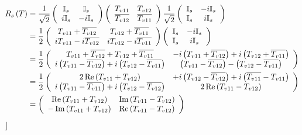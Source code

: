 \documentclass[aps,preprint]{revtex4}%
\begin{document}
\begin{align}
R_{s}\left(  T\right)   &  =\frac{1}{\sqrt{2}}\left(
\begin{array}
[c]{cc}%
\mathbb{I}_{s} & \mathbb{I}_{s}\\
i\mathbb{I}_{s} & -i\mathbb{I}_{s}%
\end{array}
\right)  \left(
\begin{array}
[c]{cc}%
T_{v11} & T_{v12}\\
\overline{T_{v12}} & \overline{T_{v11}}%
\end{array}
\right)  \frac{1}{\sqrt{2}}\left(
\begin{array}
[c]{cc}%
\mathbb{I}_{s} & -i\mathbb{I}_{s}\\
\mathbb{I}_{s} & i\mathbb{I}_{s}%
\end{array}
\right) \\
&  =\frac{1}{2}\left(
\begin{array}
[c]{cc}%
T_{v11}+\overline{T_{v12}} & T_{v12}+\overline{T_{v11}}\\
iT_{v11}-i\overline{T_{v12}} & iT_{v12}-i\overline{T_{v11}}%
\end{array}
\right)  \left(
\begin{array}
[c]{cc}%
\mathbb{I}_{s} & -i\mathbb{I}_{s}\\
\mathbb{I}_{s} & i\mathbb{I}_{s}%
\end{array}
\right) \\
&  =\frac{1}{2}\left(
\begin{array}
[c]{cc}%
T_{v11}+\overline{T_{v12}}+T_{v12}+\overline{T_{v11}} & -i\left(
T_{v11}+\overline{T_{v12}}\right)  +i\left(  T_{v12}+\overline{T_{v11}}\right)
\\
i\left(  T_{v11}-\overline{T_{v12}}\right)  +i\left(  T_{v12}-\overline
{T_{v11}}\right)  & \left(  T_{v11}-\overline{T_{v12}}\right)  -\left(
T_{v12}-\overline{T_{v11}}\right)
\end{array}
\right) \\
&  =\frac{1}{2}\left(
\begin{array}
[c]{cc}%
2\operatorname{Re}\left(  T_{v11}+T_{v12}\right)  & +i\left(  T_{v12}%
-\overline{T_{v12}}\right)  +i\left(  \overline{T_{v11}}-T_{v11}\right) \\
i\left(  T_{v11}-\overline{T_{v11}}\right)  +i\left(  T_{v12}-\overline
{T_{v12}}\right)  & 2\operatorname{Re}\left(  T_{v11}-T_{v12}\right)
\end{array}
\right) \\
&  =\left(
\begin{array}
[c]{cc}%
\operatorname{Re}\left(  T_{v11}+T_{v12}\right)  & \operatorname{Im}\left(
T_{v11}-T_{v12}\right) \\
-\operatorname{Im}\left(  T_{v11}+T_{v12}\right)  & \operatorname{Re}\left(
T_{v11}-T_{v12}\right)
\end{array}
\right)
\end{align}
$\rfloor$
\end{document}
